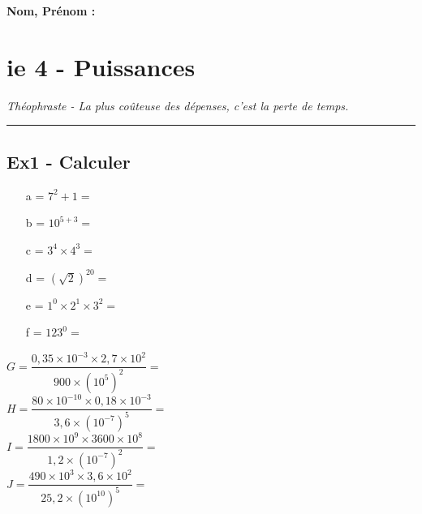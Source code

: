 \documentclass[12pt]{article}
\newcommand{\horrule}[1]{\rule{\linewidth}{#1}} %
\begin{document}

\newtheorem{Definition}{Définition}
\newtheorem{Theorem}{Théorème}
\newtheorem{Proposition}{Propriété}

\renewcommand{\labelitemi}{$\bullet$}
\renewcommand{\labelitemii}{$\circ$}

\setlength{\columnseprule}{1pt}

\textbf{Nom, Prénom : }

\section*{ie 4 - Puissances}
\begin{center}
  \textit{Théophraste - La plus coûteuse des dépenses, c’est la perte de temps.}
\end{center}
\horrule{2px}

\subsection*{Ex1 - Calculer}

\begin{multicols}{3}
  \begin{itemize}
  \item[a =] $7^2 + 1 = $ \dotfill
  \item[b =] $10^{5+3} = $ \dotfill
  \item[c =] $3^4 \times 4^3 = $ \dotfill
  \item[d =] $(\sqrt{2})^20 = $ \dotfill
  \item[e =] $1^0 \times 2^1 \times 3^2 = $ \dotfill
  \item[f =] $123^0 = $ \dotfill
  \end{itemize}

\end{multicols}

\begin{multicols}{2}

  $G = \dfrac{0,35 \times 10^{-3} \times 2,7 \times 10^{2}}{900 \times (10^5)^2} = $ \dotfill\\
  $H = \dfrac{80 \times 10^{-10} \times 0,18 \times 10^{-3}}{3,6 \times (10^{-7})^5} = $ \dotfill \\
  $I = \dfrac{1800 \times 10^{9} \times 3600 \times 10^{8}}{1,2 \times (10^{-7})^2} = $ \dotfill\\
  $J = \dfrac{490 \times 10^{3} \times 3,6 \times 10^{2}}{25,2 \times (10^{10})^5} = $ \dotfill 

\end{multicols}
\end{document}

